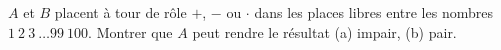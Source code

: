 $A$ et $B$ placent à tour de rôle $+$, $-$ ou $\cdot$ dans les places libres entre les nombres $1\ 2\ 3\ \ldots 99\ 100$. Montrer que $A$ peut rendre le résultat (a) impair, (b) pair.

